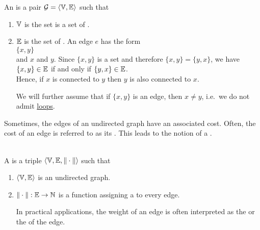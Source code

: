 \begin{Definition}
  An  is a pair
   $\mathcal{G} = \langle {\mathbb V}, {\mathbb E}\rangle$ such that
  \begin{enumerate}
  \item ${\mathbb V}$ is the set is a set of  .
  \item ${\mathbb E}$ is the set of  .  An edge $e$ has the form
        \\[0.2cm]
        \hspace*{1.3cm}
        $\{x, y\}$
        \\[0.2cm]
        and  $x$ and $y$.  Since $\{x,y\}$ is a set and therefore $\{x,y\} = \{y,x\}$, we have
        \\[0.2cm]
        \hspace*{1.3cm}
        $\{x,y\} \in {\mathbb E}$ \quad if and only if \quad $\{y,x\} \in {\mathbb E}$.
        \\[0.2cm]
        Hence, if $x$ is connected to $y$ then $y$ is also connected to $x$.

        We will further assume that if $\{x,y\}$ is an edge, then $x \not= y$, i.e.~we do not admit
        \href{https://en.wikipedia.org/wiki/Loop_(graph_theory)}{loops}.  \eox
  \end{enumerate}
\end{Definition}

\noindent
Sometimes, the edges of an undirected graph have an associated cost.  Often, the cost of an edge is referred to as
its .  This leads to the notion of a .

\begin{Definition} \hspace*{\fill} \\
  A  is a triple 
   $\langle {\mathbb V}, {\mathbb E}, \|\cdot\| \rangle$ such that
  \begin{enumerate}
  \item $\langle {\mathbb V}, {\mathbb E} \rangle$ is an undirected graph.
  \item $\|\cdot\|: {\mathbb E} \rightarrow {\mathbb N}$ is a function assigning a  to every edge.

        In practical applications, the weight of an edge is often interpreted as the  or the
         of the edge.
        \eoxs
  \end{enumerate}
\end{Definition}

